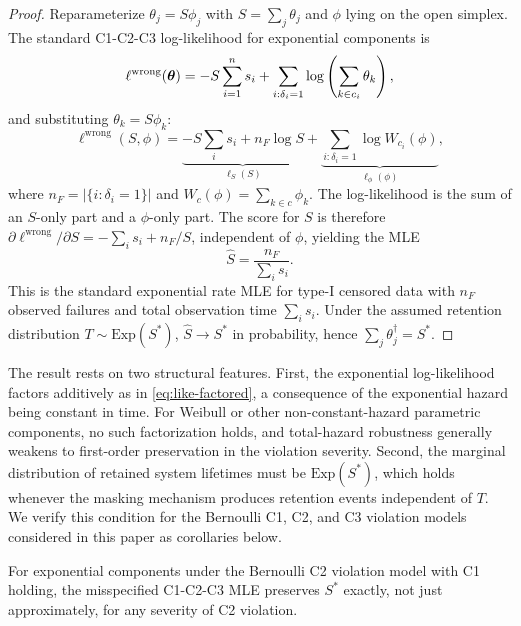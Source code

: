 \begin{proof}
Reparameterize $\theta_j = S \phi_j$ with $S = \sum_j \theta_j$ and
$\phi$ lying on the open simplex. The standard C1-C2-C3 log-likelihood for
exponential components is
\begin{equation}
    \ell^{\mathrm{wrong}}(\bm{\theta}) =
        -S \sum_{i=1}^n s_i + \sum_{i : \delta_i = 1}
        \log\left(\sum_{k \in c_i} \theta_k\right),
\end{equation}
and substituting $\theta_k = S \phi_k$:
\begin{equation}
\label{eq:like-factored}
    \ell^{\mathrm{wrong}}(S, \phi) =
        \underbrace{- S \sum_i s_i + n_F \log S}_{\ell_S(S)}
        + \underbrace{\sum_{i : \delta_i = 1} \log W_{c_i}(\phi)}_{\ell_\phi(\phi)},
\end{equation}
where $n_F = |\{i : \delta_i = 1\}|$ and
$W_c(\phi) = \sum_{k \in c} \phi_k$. The log-likelihood is the sum of an
$S$-only part and a $\phi$-only part. The score for $S$ is therefore
$\partial \ell^{\mathrm{wrong}} / \partial S = -\sum_i s_i + n_F / S$,
independent of $\phi$, yielding the MLE
\begin{equation}
\label{eq:S-mle}
    \hat S = \frac{n_F}{\sum_i s_i}.
\end{equation}
This is the standard exponential rate MLE for type-I censored data with
$n_F$ observed failures and total observation time $\sum_i s_i$. Under the
assumed retention distribution $T \sim \mathrm{Exp}(S^*)$,
$\hat S \to S^*$ in probability, hence $\sum_j \theta_j^\dagger = S^*$.
\end{proof}

\begin{remark}[Scope]
\label{rem:exact-hazard-scope}
The result rests on two structural features. First, the exponential
log-likelihood factors additively as in \eqref{eq:like-factored}, a
consequence of the exponential hazard being constant in time. For Weibull
or other non-constant-hazard parametric components, no such factorization
holds, and total-hazard robustness generally weakens to first-order
preservation in the violation severity. Second, the marginal distribution
of retained system lifetimes must be $\mathrm{Exp}(S^*)$, which holds
whenever the masking mechanism produces retention events independent of
$T$. We verify this condition for the Bernoulli C1, C2, and C3 violation
models considered in this paper as corollaries below.
\end{remark}

\begin{corollary}
\label{cor:c2-hazard-exp}
For exponential components under the Bernoulli C2 violation model with C1
holding, the misspecified C1-C2-C3 MLE preserves $S^*$ exactly, not just
approximately, for any severity of C2 violation.
\end{corollary}

